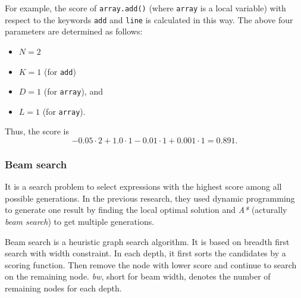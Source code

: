 \documentclass[PRO,english]{ipsj}
\begin{document}



For example, the score of \texttt{array.add()} (where \texttt{array} is a local variable) with respect to the keywords \texttt{add} and \texttt{line} is calculated in this way.  The above four parameters are determined as follows:
\begin{itemize}
\item $N=2$
\item $K=1$ (for \texttt{add})
\item $D=1$ (for \texttt{array}), and
\item $L=1$ (for \texttt{array}).
\end{itemize}
Thus, the score is 
$$
  - 0.05 \cdot 2 + 1.0 \cdot 1  -0.01 \cdot 1 + 0.001 \cdot 1 = 0.891.
$$

\subsubsection{Beam search}
It is a search problem to select expressions with the highest score among all possible generations. In the previous research, they used dynamic programming to generate one result by finding the local optimal solution and \emph{A*} (acturally \emph{beam search}) to get multiple generations.

Beam search is a heuristic graph search algorithm. It is based on breadth first search with width constraint. In each depth, it first sorts the candidates by a scoring function. Then remove the node with lower score and continue to search on the remaining node. \emph{bw}, short for beam width, denotes the number of remaining nodes for each depth.
\end{document}
